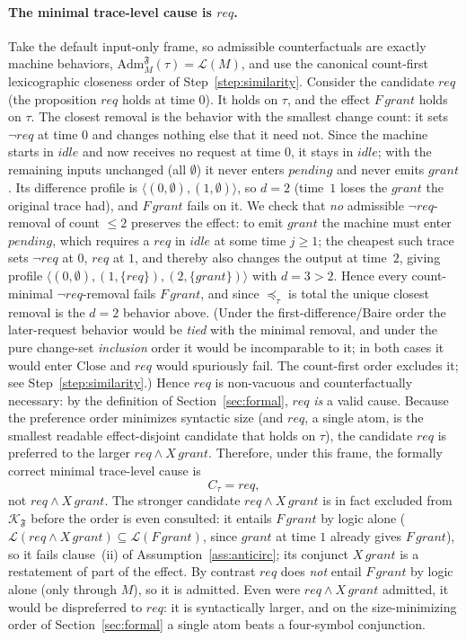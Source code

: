 \documentclass[11pt]{article}
\theoremstyle{remark}
\newcommand{\Close}{\mathrm{Close}}
\newcommand{\Lang}{\mathcal{L}}
\newcommand{\Frame}{\mathfrak{F}}
\newcommand{\Adm}{\mathrm{Adm}}
\begin{document}
\paragraph{The minimal trace-level cause is \(req\).}
Take the default input-only frame, so admissible counterfactuals are exactly
machine behaviors, \(\Adm_M^{\Frame}(\tau)=\Lang(M)\), and use the canonical
count-first lexicographic closeness order of Step~\ref{step:similarity}. Consider
the candidate \(req\) (the proposition \(req\) holds at time \(0\)). It holds on
\(\tau\), and the effect \(F\,grant\) holds on \(\tau\). The closest removal is
the behavior with the smallest change count: it sets \(\neg req\) at time \(0\)
and changes nothing else that it need not. Since the machine starts in \(idle\)
and now receives no request at time \(0\), it stays in \(idle\); with the
remaining inputs unchanged (all \(\emptyset\)) it never enters \(pending\) and
never emits \(grant\). Its difference profile is
\(\langle(0,\emptyset),(1,\emptyset)\rangle\), so \(d=2\) (time~\(1\) loses the
\(grant\) the original trace had), and \(F\,grant\) fails on it. We check that
\emph{no} admissible \(\neg req\)-removal of count \(\le 2\) preserves the effect:
to emit \(grant\) the machine must enter \(\mathit{pending}\), which requires a
\(req\) in \(idle\) at some time \(j\ge 1\); the cheapest such trace sets
\(\neg req\) at \(0\), \(req\) at \(1\), and thereby also changes the output at
time~\(2\), giving profile
\(\langle(0,\emptyset),(1,\{req\}),(2,\{grant\})\rangle\) with \(d=3>2\). Hence
every count-minimal \(\neg req\)-removal fails \(F\,grant\), and since
\(\preceq_\tau\) is total the unique closest removal is the \(d=2\) behavior
above. (Under the first-difference/Baire order the later-request behavior would
be \emph{tied} with the minimal removal, and under the pure change-set
\emph{inclusion} order it would be incomparable to it; in both cases it would
enter \(\Close\) and \(req\) would spuriously fail. The count-first order excludes
it; see Step~\ref{step:similarity}.) Hence \(req\) is non-vacuous and
counterfactually necessary: by the definition of Section~\ref{sec:formal},
\(req\) \emph{is} a valid cause.
Because the preference order minimizes syntactic size (and \(req\), a single
atom, is the smallest readable effect-disjoint candidate that holds on \(\tau\)),
the candidate \(req\) is preferred to the larger \(req\land X\,grant\). Therefore,
under this frame, the formally correct minimal trace-level cause is
\[
  C_\tau = req,
\]
not \(req\land X\,grant\). The stronger candidate \(req\land X\,grant\) is in fact
excluded from \(\mathcal{K}_{\Frame}\) before the order is even consulted: it
entails \(F\,grant\) by logic alone (\(\Lang(req\land X\,grant)\subseteq
\Lang(F\,grant)\), since \(grant\) at time \(1\) already gives \(F\,grant\)), so
it fails clause~(ii) of Assumption~\ref{ass:anticirc}; its conjunct
\(X\,grant\) is a restatement of part of the effect. By contrast \(req\) does
\emph{not} entail \(F\,grant\) by logic alone (only through \(M\)), so it is
admitted. Even were \(req\land X\,grant\) admitted, it would be dispreferred to
\(req\): it is syntactically larger, and on the size-minimizing order of
Section~\ref{sec:formal} a single atom beats a four-symbol conjunction.
\end{document}
